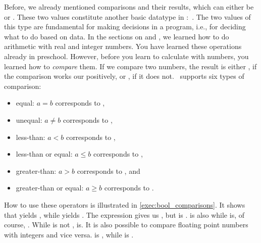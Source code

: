 %
\label{sec:bool}%
%
Before, we already mentioned comparisons and their results, which can either be  or .
These two values constitute another basic datatype in \python:~.
The two values of this type are fundamental for making decisions in a program, i.e., for deciding what to do based on data.%
%
%
%
%
%
%
In the sections on  and , we learned how to do arithmetic with real and integer numbers.
You have learned these operations already in preschool.
However, before you learn to calculate with numbers, you learned how to \emph{compare} them.
If we compare two numbers, the result is either , if the comparison works our positively, or , if it does not.
\python\ supports six types of comparison:%
%
\begin{itemize}%
%
\item equal: $a = b$ corresponds to \pythonIdx{==},%
\item unequal: $a \neq b$ corresponds to ,%
\item less-than: $a < b$ corresponds to \pythonIdx{<},%
\item less-than or equal: $a \leq b$ corresponds to \pythonIdx{<=},%
\item greater-than: $a > b$ corresponds to \pythonIdx{>}, and%
\item greater-than or equal: $a \geq b$ corresponds to \pythonIdx{>=}.%
%
\end{itemize}%
%
How to use these operators is illustrated in \cref{exec:bool_comparisons}.
It shows that \pythonIdx{==} yields , while  yields .
The expression \pythonIdx{>} gives us , but \pythonIdx{>=} is .
\pythonIdx{<} is also  while  is, of course, .
While \pythonIdx{>} is not , \pythonIdx{>} is.
It is also possible to compare floating point numbers with integers and vice versa.
\pythonIdx{==} is , while  is .
%
%
%

